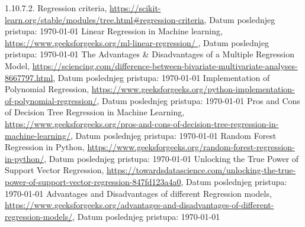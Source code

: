 \documentclass[fontsize=12bp, paper=a4]{scrarticle}
\begin{document}
\begin{thebibliography}{1}
    1.10.7.2. Regression criteria, \url{https://scikit-learn.org/stable/modules/tree.html#regression-criteria}, Datum poslednjeg pristupa: \today
    Linear Regression in Machine learning, \url{https://www.geeksforgeeks.org/ml-linear-regression/
    }, Datum poslednjeg pristupa: \today
    The Advantages \& Disadvantages of a Multiple Regression Model, \url{https://sciencing.com/difference-between-bivariate-multivariate-analyses-8667797.html}, Datum poslednjeg pristupa: \today
    Implementation of Polynomial Regression, \url{https://www.geeksforgeeks.org/python-implementation-of-polynomial-regression/}, Datum poslednjeg pristupa: \today
    Pros and Cons of Decision Tree Regression in Machine Learning, \url{https://www.geeksforgeeks.org/pros-and-cons-of-decision-tree-regression-in-machine-learning/}, Datum poslednjeg pristupa: \today
    Random Forest Regression in Python, \url{https://www.geeksforgeeks.org/random-forest-regression-in-python/}, Datum poslednjeg pristupa: \today
    Unlocking the True Power of Support Vector Regression, \url{https://towardsdatascience.com/unlocking-the-true-power-of-support-vector-regression-847fd123a4a0}, Datum poslednjeg pristupa: \today
    Advantages and Disadvantages of different Regression models, \url{https://www.geeksforgeeks.org/advantages-and-disadvantages-of-different-regression-models/}, Datum poslednjeg pristupa: \today
\end{thebibliography}








\end{document}
